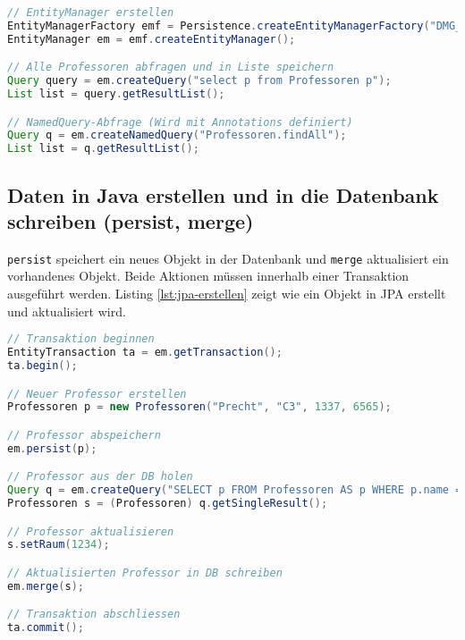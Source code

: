 \begin{lstlisting}[language=Java,keywordstyle=\color{keywordcolor},caption={JPA Grundlagen in Java},label=lst:jpa-abfrage]
// EntityManager erstellen
EntityManagerFactory emf = Persistence.createEntityManagerFactory("DMG_OOPU");
EntityManager em = emf.createEntityManager();

// Alle Professoren abfragen und in Liste speichern
Query query = em.createQuery("select p from Professoren p");
List list = query.getResultList();

// NamedQuery-Abfrage (Wird mit Annotations definiert)
Query q = em.createNamedQuery("Professoren.findAll");
List list = q.getResultList();
\end{lstlisting}

\subsection{Daten in Java erstellen und in die Datenbank schreiben (persist, merge)}

\texttt{persist} speichert ein neues Objekt in der Datenbank und \texttt{merge} aktualisiert ein vorhandenes Objekt. Beide Aktionen müssen innerhalb einer Transaktion ausgeführt werden. Listing \ref{lst:jpa-erstellen} zeigt wie ein Objekt in JPA erstellt und aktualisiert wird.

\begin{lstlisting}[language=Java,keywordstyle=\color{keywordcolor},caption={Daten schreiben mit JPA},label=lst:jpa-erstellen]
// Transaktion beginnen
EntityTransaction ta = em.getTransaction();
ta.begin();

// Neuer Professor erstellen
Professoren p = new Professoren("Precht", "C3", 1337, 6565);

// Professor abspeichern
em.persist(p);

// Professor aus der DB holen
Query q = em.createQuery("SELECT p FROM Professoren AS p WHERE p.name = 'Precht'", Professoren.class);
Professoren s = (Professoren) q.getSingleResult();

// Professor aktualisieren
s.setRaum(1234);

// Aktualisierten Professor in DB schreiben
em.merge(s);

// Transaktion abschliessen
ta.commit();
\end{lstlisting}